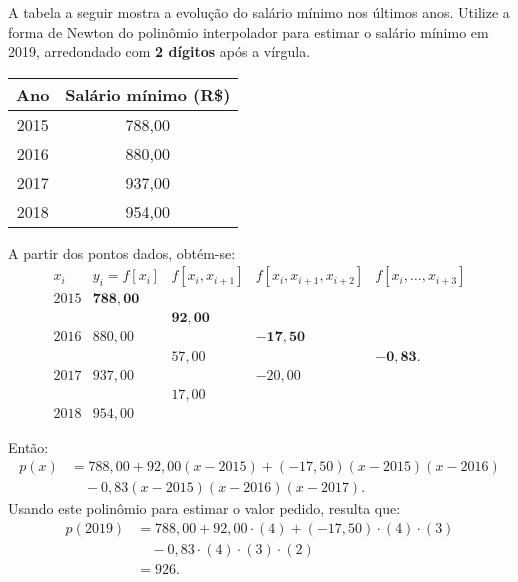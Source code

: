 \documentclass[12pt,a4paper]{article}
\begin{document}
\begin{ExerciseList}
\Exercise[title={2,5}]
A tabela a seguir mostra a evolução do salário mínimo nos últimos anos. Utilize a forma de Newton do polinômio interpolador para estimar o salário mínimo em 2019, arredondado com \textbf{2 dígitos} após a vírgula.
\medskip
\begin{center}
\begin{tabular}{cc}
\hline
Ano & Salário mínimo (R\$) \\ 
\hline
2015 & 788,00 \\
2016 & 880,00 \\
2017 & 937,00 \\
2018 & 954,00 \\
\hline
\end{tabular}
\end{center}
\Answer
A partir dos pontos dados, obtém-se:
\[
\begin{array}{ccccc}
x_i
& y_i=f[x_i]
& f[x_i,x_{i+1}]
& f[x_i,x_{i+1},x_{i+2}]
& f[x_i,\ldots,x_{i+3}]\\
2015 & \mathbf{788,00} \\
     & & \mathbf{92,00} \\
2016 & 880,00 & & \mathbf{-17,50} \\
     & & 57,00 & & \mathbf{-0,83}. \\
2017 & 937,00 & & -20,00 \\
     & & 17,00 \\
2018 & 954,00
\end{array}
\]

Então:
\begin{align*}
p(x)
&= 788,00
 +  92,00  (x-2015)
 +(-17,50) (x-2015)(x-2016)\\
&\quad -0,83 (x-2015)(x-2016)(x-2017).
\end{align*}
Usando este polinômio para estimar o valor pedido, resulta que:
\begin{align*}
p(2019)
&= 788,00
 +  92,00  \cdot (4)
 +(-17,50) \cdot (4)\cdot (3)\\
&\quad -0,83 \cdot (4)\cdot (3)\cdot (2)\\
& = 926.
\end{align*}


\end{ExerciseList}
\end{document}
